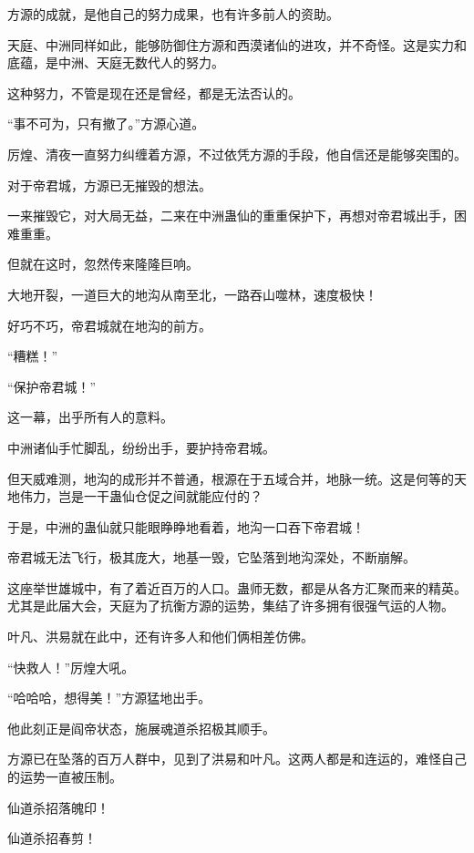 
\begin{this_body}



方源的成就，是他自己的努力成果，也有许多前人的资助。

天庭、中洲同样如此，能够防御住方源和西漠诸仙的进攻，并不奇怪。这是实力和底蕴，是中洲、天庭无数代人的努力。

这种努力，不管是现在还是曾经，都是无法否认的。

“事不可为，只有撤了。”方源心道。

厉煌、清夜一直努力纠缠着方源，不过依凭方源的手段，他自信还是能够突围的。

对于帝君城，方源已无摧毁的想法。

一来摧毁它，对大局无益，二来在中洲蛊仙的重重保护下，再想对帝君城出手，困难重重。

但就在这时，忽然传来隆隆巨响。

大地开裂，一道巨大的地沟从南至北，一路吞山噬林，速度极快！

好巧不巧，帝君城就在地沟的前方。

“糟糕！”

“保护帝君城！”

这一幕，出乎所有人的意料。

中洲诸仙手忙脚乱，纷纷出手，要护持帝君城。

但天威难测，地沟的成形并不普通，根源在于五域合并，地脉一统。这是何等的天地伟力，岂是一干蛊仙仓促之间就能应付的？

于是，中洲的蛊仙就只能眼睁睁地看着，地沟一口吞下帝君城！

帝君城无法飞行，极其庞大，地基一毁，它坠落到地沟深处，不断崩解。

这座举世雄城中，有了着近百万的人口。蛊师无数，都是从各方汇聚而来的精英。尤其是此届大会，天庭为了抗衡方源的运势，集结了许多拥有很强气运的人物。

叶凡、洪易就在此中，还有许多人和他们俩相差仿佛。

“快救人！”厉煌大吼。

“哈哈哈，想得美！”方源猛地出手。

他此刻正是阎帝状态，施展魂道杀招极其顺手。

方源已在坠落的百万人群中，见到了洪易和叶凡。这两人都是和连运的，难怪自己的运势一直被压制。

仙道杀招落魄印！

仙道杀招春剪！


\end{this_body}
